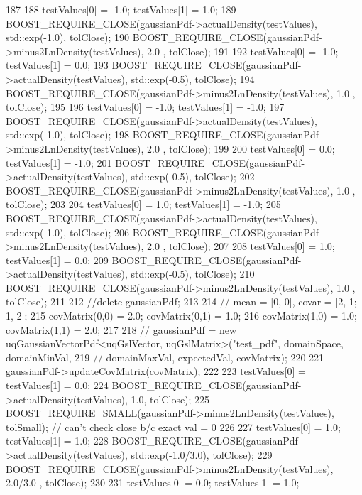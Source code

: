 \begin{DoxyCode}
187 
188   testValues[0] = -1.0; testValues[1] = 1.0;
189   BOOST\_REQUIRE\_CLOSE(gaussianPdf->actualDensity(testValues), std::exp(-1.0), tolClose);
190   BOOST\_REQUIRE\_CLOSE(gaussianPdf->minus2LnDensity(testValues),         2.0 , tolClose);
191 
192   testValues[0] = -1.0; testValues[1] = 0.0;
193   BOOST\_REQUIRE\_CLOSE(gaussianPdf->actualDensity(testValues), std::exp(-0.5), tolClose);
194   BOOST\_REQUIRE\_CLOSE(gaussianPdf->minus2LnDensity(testValues),         1.0 , tolClose);
195 
196   testValues[0] = -1.0; testValues[1] = -1.0;
197   BOOST\_REQUIRE\_CLOSE(gaussianPdf->actualDensity(testValues), std::exp(-1.0), tolClose);
198   BOOST\_REQUIRE\_CLOSE(gaussianPdf->minus2LnDensity(testValues),         2.0 , tolClose);
199 
200   testValues[0] = 0.0; testValues[1] = -1.0;
201   BOOST\_REQUIRE\_CLOSE(gaussianPdf->actualDensity(testValues), std::exp(-0.5), tolClose);
202   BOOST\_REQUIRE\_CLOSE(gaussianPdf->minus2LnDensity(testValues),         1.0 , tolClose);
203 
204   testValues[0] = 1.0; testValues[1] = -1.0;
205   BOOST\_REQUIRE\_CLOSE(gaussianPdf->actualDensity(testValues), std::exp(-1.0), tolClose);
206   BOOST\_REQUIRE\_CLOSE(gaussianPdf->minus2LnDensity(testValues),         2.0 , tolClose);
207 
208   testValues[0] = 1.0; testValues[1] = 0.0;
209   BOOST\_REQUIRE\_CLOSE(gaussianPdf->actualDensity(testValues), std::exp(-0.5), tolClose);
210   BOOST\_REQUIRE\_CLOSE(gaussianPdf->minus2LnDensity(testValues),         1.0 , tolClose);
211 
212   \textcolor{comment}{//delete gaussianPdf;}
213 
214   \textcolor{comment}{// mean = [0, 0], covar = [2, 1; 1, 2];}
215   covMatrix(0,0) = 2.0; covMatrix(0,1) = 1.0;
216   covMatrix(1,0) = 1.0; covMatrix(1,1) = 2.0;
217 
218 \textcolor{comment}{//   gaussianPdf = new uqGaussianVectorPdf<uqGslVector, uqGslMatrix>("test\_pdf", domainSpace, domainMinVal,
       }
219 \textcolor{comment}{//                                                                               domainMaxVal, expectedVal,
       covMatrix);}
220 
221   gaussianPdf->updateCovMatrix(covMatrix);
222 
223   testValues[0] = testValues[1] = 0.0;
224   BOOST\_REQUIRE\_CLOSE(gaussianPdf->actualDensity(testValues), 1.0, tolClose);
225   BOOST\_REQUIRE\_SMALL(gaussianPdf->minus2LnDensity(testValues),    tolSmall); \textcolor{comment}{// can't check close b/c
       exact val = 0}
226 
227   testValues[0] = 1.0; testValues[1] = 1.0;
228   BOOST\_REQUIRE\_CLOSE(gaussianPdf->actualDensity(testValues), std::exp(-1.0/3.0), tolClose);
229   BOOST\_REQUIRE\_CLOSE(gaussianPdf->minus2LnDensity(testValues),         2.0/3.0 , tolClose);
230 
231   testValues[0] = 0.0; testValues[1] = 1.0;

\end{DoxyCode}
